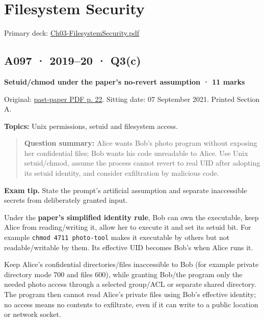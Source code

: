 \documentclass[11pt,a4paper]{article}
\begin{document}
\clearpage
\section{Filesystem Security}

Primary deck: \href{../slides/Ch03-FilesystemSecurity.pdf}{Ch03-FilesystemSecurity.\allowbreak{}pdf}




\subsection{A097 · 2019–20 · Q3(c)}\label{a097}

\textbf{Setuid/\allowbreak{}chmod under the paper’s no-revert assumption · 11 marks}


Original: \href{../../CSE405-Security_Merged.pdf\#page=22}{past-paper PDF p. 22}. Sitting date: 07 September 2021. Printed Section A.


\textbf{Topics:} Unix permissions,\allowbreak{} setuid and filesystem access.



\begin{quote}\small

\textbf{Question summary:} Alice wants Bob’s photo program without exposing her confidential files; Bob wants his code unreadable to Alice. Use Unix setuid/\allowbreak{}chmod,\allowbreak{} assume the process cannot revert to real UID after adopting its setuid identity,\allowbreak{} and consider exfiltration by malicious code.



\end{quote}


{\color{ForestGreen}\textbf{Exam tip.} State the prompt's artificial assumption and separate inaccessible secrets from deliberately granted input.}


Under the \textbf{paper's simplified identity rule},\allowbreak{} Bob can own the executable,\allowbreak{} keep Alice from reading/\allowbreak{}writing it,\allowbreak{} allow her to execute it and set its setuid bit. For example \texttt{chmod 4711 photo-tool} makes it executable by others but not readable/\allowbreak{}writable by them. Its effective UID becomes Bob's when Alice runs it.


Keep Alice's confidential directories/\allowbreak{}files inaccessible to Bob (for example private directory mode 700 and files 600),\allowbreak{} while granting Bob/\allowbreak{}the program only the needed photo access through a selected group/\allowbreak{}ACL or separate shared directory. The program then cannot read Alice's private files using Bob's effective identity; no access means no contents to exfiltrate,\allowbreak{} even if it can write to a public location or network socket.
\end{document}
